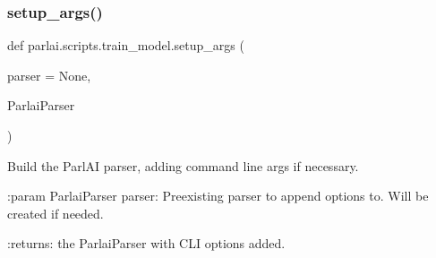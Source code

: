 \subsubsection{\texorpdfstring{setup\+\_\+args()}{setup\_args()}}
{\footnotesize\ttfamily def parlai.\+scripts.\+train\+\_\+model.\+setup\+\_\+args (\begin{DoxyParamCaption}\item[{}]{parser = {\ttfamily None},  }\item[{}]{Parlai\+Parser }\end{DoxyParamCaption})}

\begin{DoxyVerb}Build the ParlAI parser, adding command line args if necessary.

:param ParlaiParser parser:
    Preexisting parser to append options to. Will be created if needed.

:returns:
    the ParlaiParser with CLI options added.
\end{DoxyVerb}
 